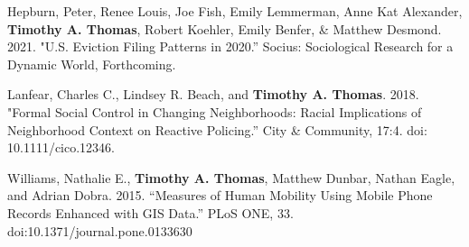 

\begin{cvparagraph}

Hepburn, Peter, Renee Louis, Joe Fish, Emily Lemmerman, Anne Kat Alexander,  \textbf{Timothy A. Thomas}, Robert Koehler, Emily Benfer, \& Matthew Desmond. 2021. "U.S. Eviction Filing Patterns in 2020.” Socius: Sociological Research for a Dynamic World, Forthcoming.
\end{cvparagraph}

\begin{cvparagraph}

Lanfear, Charles C., Lindsey R. Beach, and \textbf{Timothy A. Thomas}. 2018. "Formal Social Control in Changing Neighborhoods: Racial Implications of Neighborhood Context on Reactive Policing.” City \& Community, 17:4. doi: 10.1111/cico.12346.
\end{cvparagraph}

\begin{cvparagraph}

Williams, Nathalie E., \textbf{Timothy A. Thomas}, Matthew Dunbar, Nathan Eagle, and Adrian Dobra. 2015. “Measures of Human Mobility Using Mobile Phone Records Enhanced
with GIS Data.” PLoS ONE, 33. doi:10.1371/journal.pone.0133630
\end{cvparagraph}





